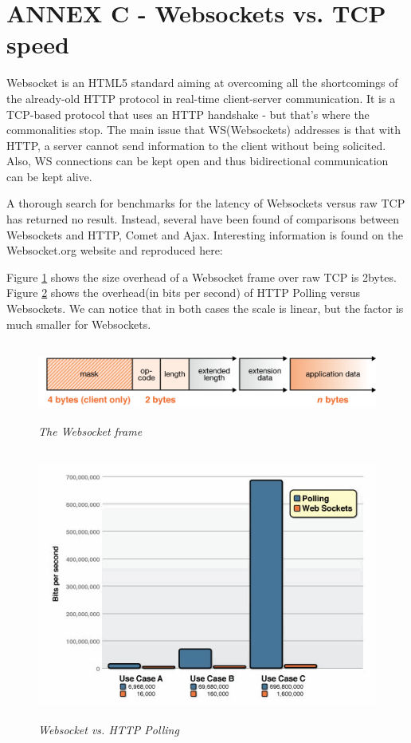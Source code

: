 \documentclass{article}
\begin{document}
\section{ANNEX C - Websockets vs. TCP speed}

Websocket is an HTML5 standard aiming at overcoming all the shortcomings of the
already-old HTTP protocol in real-time client-server communication. It is a
TCP-based protocol that uses an HTTP handshake - but that's where the
commonalities stop. The main issue that WS(Websockets) addresses is that with
HTTP, a server cannot send information to the client without being solicited.
Also, WS connections can be kept open and thus bidirectional communication can
be kept alive.\newline

A thorough search for benchmarks for the latency of Websockets versus raw TCP
has returned no result. Instead, several have been found of comparisons between
Websockets and HTTP, Comet and Ajax. Interesting information is found on the
Websocket.org website and reproduced here: \newline

Figure \ref{fig:websocket_frame} shows the size overhead of a Websocket frame
over raw TCP is 2bytes. Figure \ref{fig:websocket_ws_vs_polling} shows the
overhead(in bits per second) of HTTP Polling versus Websockets. We can notice
that in both cases the scale is linear, but the factor is much smaller for
Websockets.\newline

\begin{figure}
\includegraphics[height=1in,width=7.12in]{./images/websockets/WebSocketFrame.png}  
\caption{\small \sl The Websocket frame \label{fig:websocket_frame}}
\end{figure}

\begin{figure}
\includegraphics[height=3.5in,width=6.23in]{./images/websockets/poll-ws-compare.png}  
\caption{\small \sl Websocket vs. HTTP Polling
\label{fig:websocket_ws_vs_polling}}
\end{figure}
\end{document}
